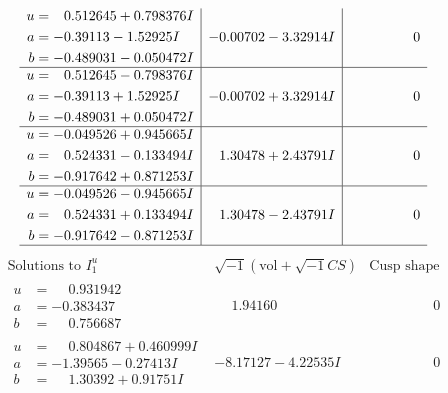 \documentclass[1p]{elsarticle_modified}
\theoremstyle{definition}
\newcommand{\I}{\sqrt{-1}}
\begin{document}
$$\begin{array}{c|c|c}
\begin{aligned}
u &= \phantom{-}0.512645 + 0.798376 I \\
a &= -0.39113 - 1.52925 I \\
b &= -0.489031 - 0.050472 I\end{aligned}
 & -0.00702 - 3.32914 I & \phantom{-0.000000 } 0 \\ \hline\begin{aligned}
u &= \phantom{-}0.512645 - 0.798376 I \\
a &= -0.39113 + 1.52925 I \\
b &= -0.489031 + 0.050472 I\end{aligned}
 & -0.00702 + 3.32914 I & \phantom{-0.000000 } 0 \\ \hline\begin{aligned}
u &= -0.049526 + 0.945665 I \\
a &= \phantom{-}0.524331 - 0.133494 I \\
b &= -0.917642 + 0.871253 I\end{aligned}
 & \phantom{-}1.30478 + 2.43791 I & \phantom{-0.000000 } 0 \\ \hline\begin{aligned}
u &= -0.049526 - 0.945665 I \\
a &= \phantom{-}0.524331 + 0.133494 I \\
b &= -0.917642 - 0.871253 I\end{aligned}
 & \phantom{-}1.30478 - 2.43791 I & \phantom{-0.000000 } 0\\
 \hline 
 \end{array}$$\newpage$$\begin{array}{c|c|c}  
\text{Solutions to }I^u_{1}& \I (\text{vol} + \sqrt{-1}CS) & \text{Cusp shape}\\
 \hline 
\begin{aligned}
u &= \phantom{-}0.931942\phantom{ +0.000000I} \\
a &= -0.383437\phantom{ +0.000000I} \\
b &= \phantom{-}0.756687\phantom{ +0.000000I}\end{aligned}
 & \phantom{-}1.94160\phantom{ +0.000000I} & \phantom{-0.000000 } 0 \\ \hline\begin{aligned}
u &= \phantom{-}0.804867 + 0.460999 I \\
a &= -1.39565 - 0.27413 I \\
b &= \phantom{-}1.30392 + 0.91751 I\end{aligned}
 & -8.17127 - 4.22535 I & \phantom{-0.000000 } 0 \\ \hline\begin{aligned}

\end{aligned}
\end{array}$$
\end{document}
